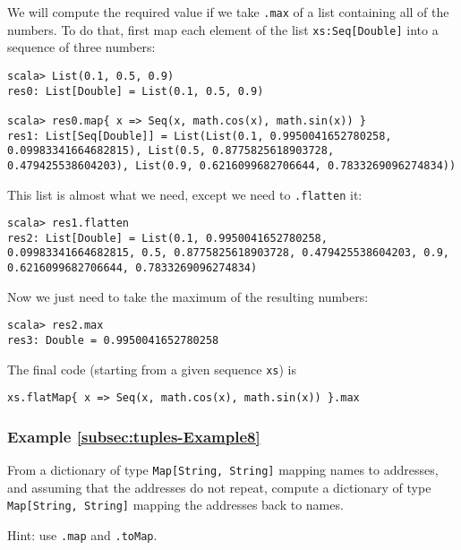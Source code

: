 We will compute the required value if we take \lstinline!.max!
of a list containing all of the numbers. To do that, first map each
element of the list \lstinline!xs:Seq[Double]!
into a sequence of three numbers:
\begin{lstlisting}
scala> List(0.1, 0.5, 0.9)
res0: List[Double] = List(0.1, 0.5, 0.9)

scala> res0.map{ x => Seq(x, math.cos(x), math.sin(x)) }
res1: List[Seq[Double]] = List(List(0.1, 0.9950041652780258, 0.09983341664682815), List(0.5, 0.8775825618903728, 0.479425538604203), List(0.9, 0.6216099682706644, 0.7833269096274834))
\end{lstlisting}
This list is almost what we need, except we need to \lstinline!.flatten!
it:
\begin{lstlisting}
scala> res1.flatten
res2: List[Double] = List(0.1, 0.9950041652780258, 0.09983341664682815, 0.5, 0.8775825618903728, 0.479425538604203, 0.9, 0.6216099682706644, 0.7833269096274834)
\end{lstlisting}
Now we just need to take the maximum of the resulting numbers:
\begin{lstlisting}
scala> res2.max
res3: Double = 0.9950041652780258
\end{lstlisting}
The final code (starting from a given sequence \lstinline!xs!)
is

\begin{lstlisting}
xs.flatMap{ x => Seq(x, math.cos(x), math.sin(x)) }.max
\end{lstlisting}

\subsubsection{Example \label{subsec:tuples-Example8}\ref{subsec:tuples-Example8}}

From a dictionary of type \lstinline!Map[String, String]!
mapping names to addresses, and assuming that the addresses do not
repeat, compute a dictionary of type \lstinline!Map[String, String]!
mapping the addresses back to names.

Hint: use \lstinline!.map!
and \lstinline!.toMap!.

